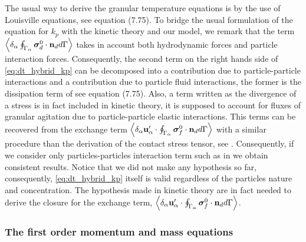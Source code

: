 The usual way to derive the granular temperature equations is by the use of Louisville equations, see \citet[Chapter 7 and 9]{rao2008introduction} equation (7.75). 
To bridge the usual formulation of the equation for $k_p$ with the kinetic theory and our model, we remark that the term $\left<\delta_\alpha \oint_{\Gamma_{\alpha}} \bm{\sigma}_d^0 \cdot \textbf{n}_d d\Gamma\right>$ takes in account both hydrodynamic forces and particle interaction forces. 
Consequently, the second term on the right hands side of \ref{eq:dt_hybrid_kp} can be decomposed into a contribution due to particle-particle interactions and a contribution due to particle fluid interactions, the former is the dissipation term of see \citet[Chapter 7 and 9]{rao2008introduction} equation (7.75). 
Also, a term written as the divergence of a stress is in fact included in kinetic theory, it is supposed to account for fluxes of granular agitation due to particle-particle elastic interactions. 
This terms can be recovered from the exchange term $\left<\delta_\alpha \textbf{u}_\alpha'\cdot\oint_{\Gamma_{\alpha}} \bm{\sigma}_f^0 \cdot \textbf{n}_d d\Gamma\right>$ with a similar procedure than the derivation of the contact stress tensor, see \citet{scorsim2021particle}. 
Consequently, if we consider only particles-particles interaction term such as in \citet{rao2008introduction} we obtain consistent results. 
Notice that we did not make any hypothesis so far, consequently, \ref{eq:dt_hybrid_kp} itself is valid regardless of the particles nature and concentration.
The hypothesis made in kinetic theory are in fact needed to derive the closure for the exchange term, $\left<\delta_\alpha \textbf{u}_\alpha'\cdot\oint_{\Gamma_{\alpha}} \bm{\sigma}_f^0 \cdot \textbf{n}_d d\Gamma\right>$. 

\subsubsection{The first order momentum and mass equations}

